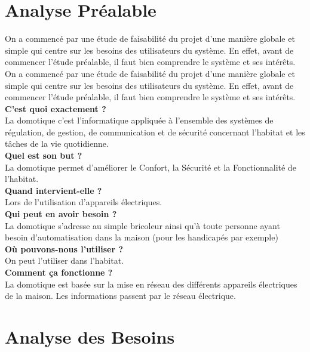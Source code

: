 \begin{spacing}{1.2}
\section{Analyse Préalable}
On a commencé par une étude de faisabilité du projet d'une manière globale et simple qui centre sur les besoins des utilisateurs du système. En effet, avant de commencer l’étude préalable, il faut bien comprendre le système et ses intérêts.
On a commencé par une étude de faisabilité du projet d'une manière globale et simple qui centre sur les besoins des utilisateurs du système. En effet, avant de commencer l’étude préalable, il faut bien comprendre le système et ses intérêts. \\
\textbf{C’est quoi exactement ? } \\
La domotique c'est l'informatique appliquée à l'ensemble des systèmes de régulation, de gestion, de communication et de sécurité concernant l'habitat et les tâches de la vie quotidienne. \\
\textbf{Quel est son but ?} \\
La domotique permet d'améliorer le Confort, la Sécurité et la Fonctionnalité de l'habitat. \\
\textbf{Quand intervient-elle ?} \\
Lors de l'utilisation d'appareils électriques. \\
\textbf{Qui peut en avoir besoin ?} \\
La domotique s'adresse au simple bricoleur ainsi qu'à toute personne ayant besoin d'automatisation dans la maison (pour les handicapés par exemple) \\
\textbf{Où pouvons-nous l’utiliser ? } \\
On peut l'utiliser dans l'habitat.\\
\textbf{Comment ça fonctionne ? } \\
La domotique est basée sur la mise en réseau des différents appareils électriques de la maison. Les informations passent par le réseau électrique. \\

\bigskip

\section{Analyse des Besoins}


\end{spacing}
